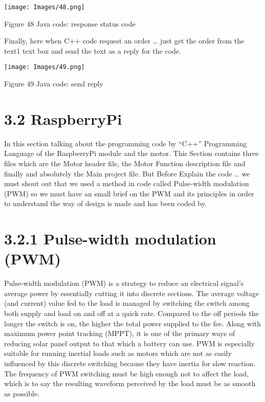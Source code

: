 \documentclass{article}
\begin{document}
\begin{center}
    \texttt{[image: Images/48.png]}

    Figure 48 Java code: response status code    
\end{center}

Finally, here when C++ code request an order … just get the order from the text1 text box and send the text as a reply for the code.

\begin{center}
    \texttt{[image: Images/49.png]}

    Figure 49 Java code: send reply
\end{center}

\section{3.2 RaspberryPi}

In this section talking about the programming code by “C++” Programming Language of the RaspberryPi module and the motor. This Section contains three files which are the Motor header file, the Motor Function description file and finally and absolutely the Main project file. But Before Explain the code … we must shout out that we used a method in code called Pulse-width modulation (PWM) so we must have an small brief on the PWM and its principles in order to understand the way of design is made and has been coded by.

\section{3.2.1 Pulse-width modulation (PWM)}

Pulse-width modulation (PWM) is a strategy to reduce an electrical signal's average power by essentially cutting it into discrete sections. The average voltage (and current) value fed to the load is managed by switching the switch among both supply and load on and off at a quick rate. Compared to the off periods the longer the switch is on, the higher the total power supplied to the fee. Along with maximum power point tracking (MPPT), it is one of the primary ways of reducing solar panel output to that which a battery can use. PWM is especially suitable for running inertial loads such as motors which are not as easily influenced by this discrete switching because they have inertia for slow reaction. The frequency of PWM switching must be high enough not to affect the load, which is to say the resulting waveform perceived by the load must be as smooth as possible.
\end{document}
